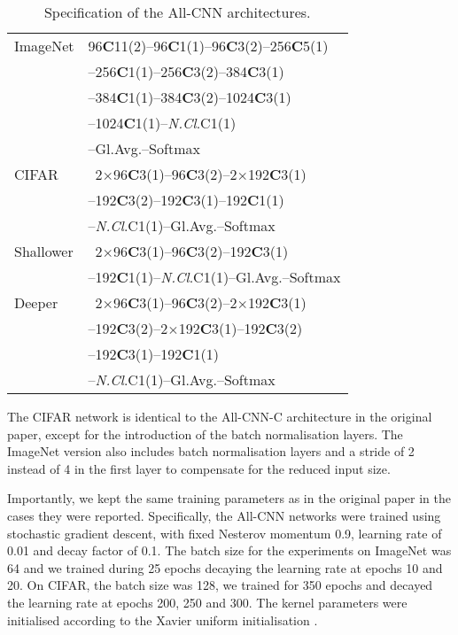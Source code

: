 {\begin{table}[ht]
\begin{center}
\begin{tabular}{l|l}
\multirow{1}{*}{ImageNet}  & 96\textbf{C}11(2)--96\textbf{C}1(1)--96\textbf{C}3(2)--256\textbf{C}5(1) \\
                           & --256\textbf{C}1(1)--256\textbf{C}3(2)--384\textbf{C}3(1) \\
                           & --384\textbf{C}1(1)--384\textbf{C}3(2)--1024\textbf{C}3(1) \\
                           & --1024\textbf{C}1(1)--\textit{N.Cl}.C1(1) \\
                           & --Gl.Avg.--Softmax \\ [3pt]
\multirow{1}{*}{CIFAR}     & ~2$\times$96\textbf{C}3(1)--96\textbf{C}3(2)--2$\times$192\textbf{C}3(1) \\
                           & --192\textbf{C}3(2)--192\textbf{C}3(1)--192\textbf{C}1(1) \\
                           & --\textit{N.Cl}.C1(1)--Gl.Avg.--Softmax \\ [3pt]
\multirow{1}{*}{Shallower} & ~2$\times$96\textbf{C}3(1)--96\textbf{C}3(2)--192\textbf{C}3(1) \\
                           & --192\textbf{C}1(1)--\textit{N.Cl}.C1(1)--Gl.Avg.--Softmax \\ [3pt]
\multirow{1}{*}{Deeper}    & ~2$\times$96\textbf{C}3(1)--96\textbf{C}3(2)--2$\times$192\textbf{C}3(1) \\
                           & --192\textbf{C}3(2)--2$\times$192\textbf{C}3(1)--192\textbf{C}3(2) \\
                           & --192\textbf{C}3(1)--192\textbf{C}1(1) \\
                           & --\textit{N.Cl}.C1(1)--Gl.Avg.--Softmax \\
\end{tabular}
\end{center}
\caption{Specification of the All-CNN architectures.}
\label{tab:allcnn}
\end{table}

The CIFAR network is identical to the All-CNN-C architecture in the original paper, except for the introduction of the batch normalisation layers. The ImageNet version also includes batch normalisation layers and a stride of 2 instead of 4 in the first layer to compensate for the reduced input size. 

Importantly, we kept the same training parameters as in the original paper in the cases they were reported. Specifically, the All-CNN networks were trained using stochastic gradient descent, with fixed Nesterov momentum 0.9, learning rate of 0.01 and decay factor of 0.1. The batch size for the experiments on ImageNet was 64 and we trained during 25 epochs decaying the learning rate at epochs 10 and 20. On CIFAR, the batch size was 128, we trained for 350 epochs and decayed the learning rate at epochs 200, 250 and 300. The kernel parameters were initialised according to the Xavier uniform initialisation \citep{glorot2010glorot}.

}

